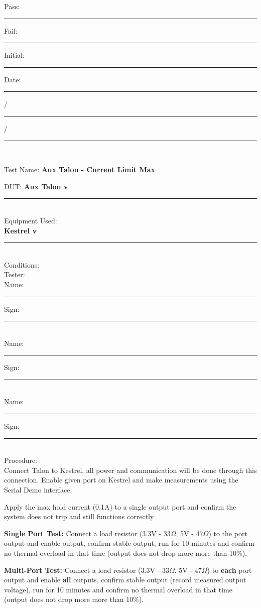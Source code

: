 \vfill

{\large Pass: \rule{1cm}{0.15mm} \hspace{1cm} Fail: \rule{1cm}{0.15mm}} \hfill Initial: \rule{2cm}{0.15mm} \hspace{1cm} Date: \rule{0.5cm}{0.15mm}/\rule{0.5cm}{0.15mm}/\rule{1cm}{0.15mm}\\[5pt]

\pagebreak

{\Huge Test Name: \textbf{Aux Talon - Current Limit Max}}\\[20pt]
{\Large DUT: \textbf{Aux Talon v}\rule{1cm}{0.15mm}} \\[10pt]
{\Large Equipment Used: }\\[5pt]
\textbf{Kestrel v}\rule{1cm}{0.15mm}\\[40pt]
{\Large Conditions: }\\[40pt]
{\Large Tester: }\\[10pt]
Name: \rule{4cm}{0.15mm} \hfill Sign: \rule{4cm}{0.15mm}\\[5pt]
Name: \rule{4cm}{0.15mm} \hfill Sign: \rule{4cm}{0.15mm}\\[5pt]
Name: \rule{4cm}{0.15mm} \hfill Sign: \rule{4cm}{0.15mm}\\[15pt]
{\Large Procedure: }\\
Connect Talon to Kestrel, all power and communication will be done through this connection. Enable given port on Kestrel and make measurements using the Serial Demo interface. 

Apply the max hold current (0.1A) to a single output port and confirm the system does not trip and still functions correctly 

\textbf{Single Port Test:} Connect a load resistor (3.3V - $33\Omega$, 5V - $47\Omega$) to the port output and enable output, confirm stable output, run for 10 minutes and confirm no thermal overload in that time (output does not drop more more than 10\%). 

\textbf{Multi-Port Test:} Connect a load resistor (3.3V - $33\Omega$, 5V - $47\Omega$) to \textbf{each} port output and enable \textbf{all} outputs, confirm stable output (record measured output voltage), run for 10 minutes and confirm no thermal overload in that time (output does not drop more more than 10\%). 


